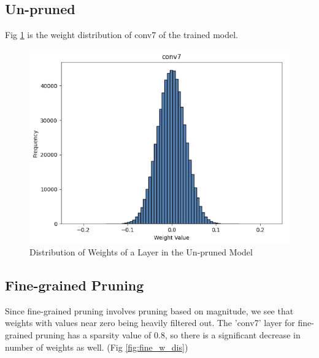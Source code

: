 \documentclass[12pt]{article}
\begin{document}
\subsection{Un-pruned}
Fig \ref{fig:unpruned_w_dist} is the weight distribution of conv7 of the trained model.
\begin{figure}[h]
  \centering
  \includegraphics[width=0.5\linewidth]{report_images/unpruned_w_dist.png}
  \caption{\label{fig:unpruned_w_dist}Distribution of Weights of a Layer in the Un-pruned Model}
\end{figure}

\subsection{Fine-grained Pruning}
Since fine-grained pruning involves pruning based on magnitude, we see that weights with values near zero being heavily filtered out. The 'conv7' layer for fine-grained pruning has a sparsity value of 0.8, so there is a significant decrease in number of weights as well. (Fig \ref{fig:fine_w_dis})
\end{document}
